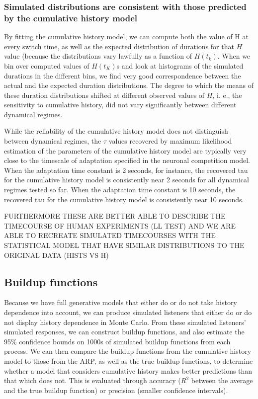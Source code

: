 \subsubsection{Simulated distributions are consistent with those predicted by the cumulative history model}
By fitting the cumulative history model, we can compute both the value of H at every switch time, as well as the expected distribution of durations for that $H$ value (because the distributions vary lawfully as a function of $H(t_k)$. When we bin over computed values of $H(t_K)$s and look at histograms of the simulated durations in the different bins, we find very good correspondence between the actual and the expected duration distributions. The degree to which the means of these duration distributions shifted at different observed values of $H$, i. e., the sensitivity to cumulative history, did not vary significantly between different dynamical regimes.

While the reliability of the cumulative history model does not distinguish between dynamical regimes, the $\tau$ values recovered by maximum likelihood estimation of the parameters of the cumulative history model are typically very close to the timescale of adaptation specified in the neuronal competition model. When the adaptation time constant is 2 seconds, for instance, the recovered tau for the cumulative history model is consistently near 2 seconds for all dynamical regimes tested so far. When the adaptation time constant is 10 seconds, the recovered tau for the cumulative history model is consistently near 10 seconds.

FURTHERMORE THESE ARE BETTER ABLE TO DESCRIBE THE TIMECOURSE OF HUMAN EXPERIMENTS (LL TEST) AND WE ARE ABLE TO RECREATE SIMULATED TIMECOURSES WITH THE STATISTICAL MODEL THAT HAVE SIMILAR DISTRIBUTIONS TO THE ORIGINAL DATA (HISTS VS H)

\subsection{Buildup functions}

Because we have full generative models that either do or do not take history dependence into account, we can produce simulated listeners that either do or do not display history dependence in Monte Carlo. From these simulated listeners’ simulated responses, we can construct buildup functions, and also estimate the 95\% confidence bounds on 1000s of simulated buildup functions from each process. We can then compare the buildup functions from the cumulative history model to those from the ARP, as well as the true buildup functions, to determine whether a model that considers cumulative history makes better predictions than that which does not. This is evaluated through accuracy ($R^2$ between the average and the true buildup function) or precision (smaller confidence intervals).

